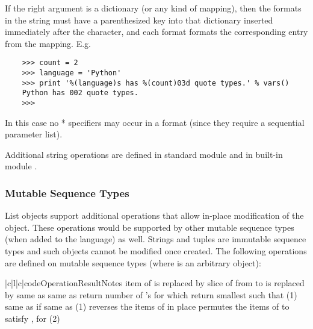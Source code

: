 If the right argument is a dictionary (or any kind of mapping), then
the formats in the string must have a parenthesized key into that
dictionary inserted immediately after the \code{\%} character, and
each format formats the corresponding entry from the mapping.  E.g.
\begin{verbatim}
    >>> count = 2
    >>> language = 'Python'
    >>> print '%(language)s has %(count)03d quote types.' % vars()
    Python has 002 quote types.
    >>> 
\end{verbatim}
In this case no * specifiers may occur in a format (since they
require a sequential parameter list).

Additional string operations are defined in standard module
 and in built-in module .

\subsubsection{Mutable Sequence Types}

List objects support additional operations that allow in-place
modification of the object.
These operations would be supported by other mutable sequence types
(when added to the language) as well.
Strings and tuples are immutable sequence types and such objects cannot
be modified once created.
The following operations are defined on mutable sequence types (where
 is an arbitrary object):

\begin{tableiii}{|c|l|c|}{code}{Operation}{Result}{Notes}
	{item  of  is replaced by }{}
  	{slice of  from  to  is replaced by }{}
	{same as }{}
	{same as }{}
	{return number of 's for which }{}
	{return smallest  such that }{(1)}
	{same as 
	  if }{}
	{same as }{(1)}
	{reverses the items of  in place}{}
	{permutes the items of  to satisfy
        ,
        for }{(2)}
\end{tableiii}
\renewcommand{\indexsubitem}{(list method)}


